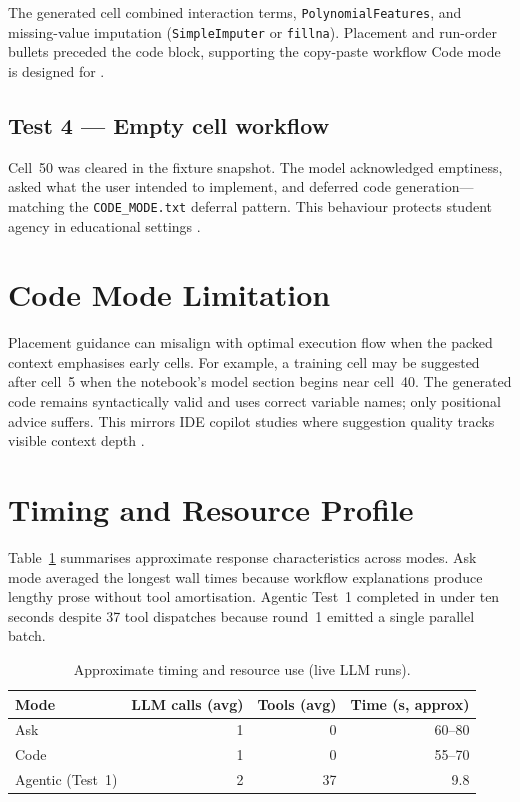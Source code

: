 The generated cell combined interaction terms, \texttt{PolynomialFeatures}, and missing-value imputation (\texttt{SimpleImputer} or \texttt{fillna}). Placement and run-order bullets preceded the code block, supporting the copy-paste workflow Code mode is designed for \parencite{mcnutt2023notebookassistants}.

\subsection{Test 4 --- Empty cell workflow}
\label{sec:code-empty}

Cell~50 was cleared in the fixture snapshot. The model acknowledged emptiness, asked what the user intended to implement, and deferred code generation---matching the \texttt{CODE\_MODE.txt} deferral pattern. This behaviour protects student agency in educational settings \parencite{finnieansley2022codex}.

\section{Code Mode Limitation}
\label{sec:code-limitations}

Placement guidance can misalign with optimal execution flow when the packed context emphasises early cells. For example, a training cell may be suggested after cell~5 when the notebook's model section begins near cell~40. The generated code remains syntactically valid and uses correct variable names; only positional advice suffers. This mirrors IDE copilot studies where suggestion quality tracks visible context depth \parencite{ziegler2024copilot,mozannar2024reading}.

\section{Timing and Resource Profile}
\label{sec:timing}

Table~\ref{tab:timing} summarises approximate response characteristics across modes. Ask mode averaged the longest wall times because workflow explanations produce lengthy prose without tool amortisation. Agentic Test~1 completed in under ten seconds despite 37 tool dispatches because round~1 emitted a single parallel batch.

\begin{table}[!ht]
\centering
\caption{Approximate timing and resource use (live LLM runs).}
\label{tab:timing}
\small
\begin{tabular}{|l|r|r|r|}
\hline
\textbf{Mode} & \textbf{LLM calls (avg)} & \textbf{Tools (avg)} & \textbf{Time (s, approx)} \\ \hline
Ask & 1 & 0 & 60--80 \\
Code & 1 & 0 & 55--70 \\
Agentic (Test~1) & 2 & 37 & 9.8 \\ \hline
\end{tabular}
\end{table}

